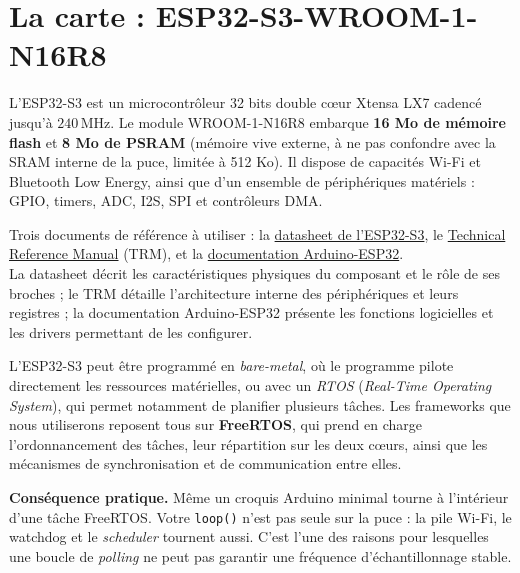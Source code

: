 \newpage

\section{La carte : ESP32-S3-WROOM-1-N16R8}

L'ESP32-S3 est un microcontrôleur 32 bits double c\oe ur Xtensa LX7 cadencé jusqu'à $240\,\mathrm{MHz}$. Le module WROOM-1-N16R8 embarque \textbf{16 Mo de mémoire flash} et \textbf{8 Mo de PSRAM} (mémoire vive externe, à ne pas confondre avec la SRAM interne de la puce, limitée à 512 Ko). Il dispose de capacités Wi-Fi et Bluetooth Low Energy, ainsi que d'un ensemble de périphériques matériels : GPIO, timers, ADC, I2S, SPI et contrôleurs DMA.\\

\begin{imp}
Trois documents de référence à utiliser :
la \href{https://www.mouser.fr/datasheet/3/1574/1/esp32-s3-wroom-1_wroom-1u_datasheet_en.pdf}{datasheet de l'ESP32-S3},
le \href{https://documentation.espressif.com/esp32-s3_technical_reference_manual_en.pdf}{Technical Reference Manual} (TRM),
et la \href{https://docs.espressif.com/projects/arduino-esp32/en/latest/getting_started.html}{documentation Arduino-ESP32}.\\
La datasheet décrit les caractéristiques physiques du composant et le rôle de ses broches ; le TRM détaille l'architecture interne des périphériques et leurs registres ; la documentation Arduino-ESP32 présente les fonctions logicielles et les drivers permettant de les configurer.
\end{imp}

L'ESP32-S3 peut être programmé en \textit{bare-metal}, où le programme pilote directement les ressources matérielles, ou avec un \textit{RTOS} (\textit{Real-Time Operating System}), qui permet notamment de planifier plusieurs tâches. Les frameworks que nous utiliserons reposent tous sur \textbf{FreeRTOS}, qui prend en charge l'ordonnancement des tâches, leur répartition sur les deux c\oe urs, ainsi que les mécanismes de synchronisation et de communication entre elles.\\

\begin{imp}
\textbf{Conséquence pratique.} Même un croquis Arduino minimal tourne à l'intérieur d'une tâche FreeRTOS. Votre \texttt{loop()} n'est pas seule sur la puce : la pile Wi-Fi, le watchdog et le \textit{scheduler} tournent aussi. C'est l'une des raisons pour lesquelles une boucle de \textit{polling} ne peut pas garantir une fréquence d'échantillonnage stable.
\end{imp}

